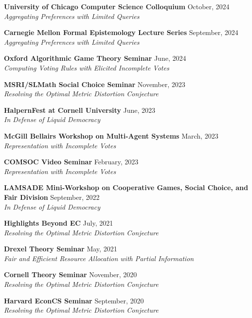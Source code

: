 \documentclass{article}
\begin{document}
\textbf{University of Chicago Computer Science Colloquium} \hfill October, 2024 \\
\textit{Aggregating Preferences with Limited Queries}

\textbf{Carnegie Mellon Formal Epistemology Lecture Series} \hfill September, 2024 \\
\textit{Aggregating Preferences with Limited Queries}

\textbf{Oxford Algorithmic Game Theory Seminar} \hfill June, 2024 \\
\textit{Computing Voting Rules with Elicited Incomplete Votes}

\textbf{MSRI/SLMath Social Choice Seminar} \hfill November, 2023 \\
\textit{Resolving the Optimal Metric Distortion Conjecture}


\textbf{HalpernFest at Cornell University} \hfill June, 2023 \\
\textit{In Defense of Liquid Democracy}

\textbf{McGill Bellairs Workshop on Multi-Agent Systems} \hfill March, 2023 \\
\textit{Representation with Incomplete Votes}

\textbf{COMSOC Video Seminar} \hfill February, 2023 \\
\textit{Representation with Incomplete Votes}

\textbf{LAMSADE Mini-Workshop on Cooperative Games, Social Choice, and Fair Division} \hfill September, 2022 \\
\textit{In Defense of Liquid Democracy}

\textbf{Highlights Beyond EC} \hfill July, 2021 \\
\textit{Resolving the Optimal Metric Distortion Conjecture}

\textbf{Drexel Theory Seminar} \hfill May, 2021 \\
\textit{Fair and Efficient Resource Allocation with Partial Information}

\textbf{Cornell Theory Seminar} \hfill November, 2020 \\
\textit{Resolving the Optimal Metric Distortion Conjecture}

\textbf{Harvard EconCS Seminar} \hfill September, 2020 \\
\textit{Resolving the Optimal Metric Distortion Conjecture}
\end{document}
